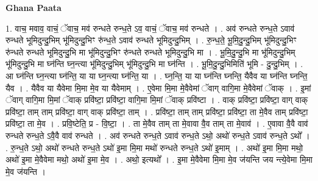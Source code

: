 \documentclass[17pt]{extarticle}
\begin{document}
\textbf{Ghana Paata } \newline

1. वाच॒ मवाव॒ वाचं॒ ॅवाच॒ मव॑ रुन्धते रुन्ध॒ते ऽव॒ वाचं॒ ॅवाच॒ मव॑ रुन्धते । . अव॑ रुन्धते रुन्ध॒ते ऽवाव॑ रुन्धते भूमिदुन्दु॒भिम् भू॑मिदुन्दु॒भिꣳ रु॑न्ध॒ते ऽवाव॑ रुन्धते भूमिदुन्दु॒भिम् । . रु॒न्ध॒ते॒ भू॒मि॒दु॒न्दु॒भिम् भू॑मिदुन्दु॒भिꣳ रु॑न्धते रुन्धते भूमिदुन्दु॒भि मा भू॑मिदुन्दु॒भिꣳ रु॑न्धते रुन्धते भूमिदुन्दु॒भि मा । . भू॒मि॒दु॒न्दु॒भि मा भू॑मिदुन्दु॒भिम् भू॑मिदुन्दु॒भि मा घ्न॑न्ति घ्न॒न्त्या भू॑मिदुन्दु॒भिम् भू॑मिदुन्दु॒भि मा घ्न॑न्ति । . भू॒मि॒दु॒न्दु॒भिमिति॑ भूमि - दु॒न्दु॒भिम् । . आ घ्न॑न्ति घ्न॒न्त्या घ्न॑न्ति॒ या या घ्न॒न्त्या घ्न॑न्ति॒ या । . घ्न॒न्ति॒ या या घ्न॑न्ति घ्नन्ति॒ यैवैव या घ्न॑न्ति घ्नन्ति॒ यैव । . यैवैव या यैवेमा मि॒मा मे॒व या यैवेमाम् । . ए॒वेमा मि॒मा मे॒वैवेमां ॅवाग् वागि॒मा मे॒वैवेमां ॅवाक् । . इ॒मां ॅवाग् वागि॒मा मि॒मां ॅवाक् प्रवि॑ष्टा॒ प्रवि॑ष्टा॒ वागि॒मा मि॒मां ॅवाक् प्रवि॑ष्टा । . वाक् प्रवि॑ष्टा॒ प्रवि॑ष्टा॒ वाग् वाक् प्रवि॑ष्टा॒ ताम् ताम् प्रवि॑ष्टा॒ वाग् वाक् प्रवि॑ष्टा॒ ताम् । . प्रवि॑ष्टा॒ ताम् ताम् प्रवि॑ष्टा॒ प्रवि॑ष्टा॒ ता मे॒वैव ताम् प्रवि॑ष्टा॒ प्रवि॑ष्टा॒ ता मे॒व । . प्रवि॒ष्टेति॒ प्र - वि॒ष्टा॒ । . ता मे॒वैव ताम् ता मे॒वावा वै॒व ताम् ता मे॒वाव॑ । . ए॒वावा वै॒वै वाव॑ रुन्धते रुन्ध॒ते ऽवै॒वै वाव॑ रुन्धते । . अव॑ रुन्धते रुन्ध॒ते ऽवाव॑ रुन्ध॒ते ऽथो॒ अथो॑ रुन्ध॒ते ऽवाव॑ रुन्ध॒ते ऽथो᳚ । . रु॒न्ध॒ते ऽथो॒ अथो॑ रुन्धते रुन्ध॒ते ऽथो॑ इ॒मा मि॒मा मथो॑ रुन्धते रुन्ध॒ते ऽथो॑ इ॒माम् । . अथो॑ इ॒मा मि॒मा मथो॒ अथो॑ इ॒मा मे॒वैवेमा मथो॒ अथो॑ इ॒मा मे॒व । . अथो॒ इत्यथो᳚ । . इ॒मा मे॒वैवेमा मि॒मा मे॒व ज॑यन्ति जय न्त्ये॒वेमा मि॒मा मे॒व ज॑यन्ति । \newline
\end{document}
